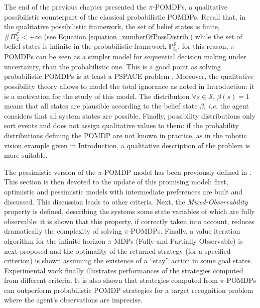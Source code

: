 The end of the previous chapter presented the $\pi$-POMDPs, 
a qualitative possibilistic counterpart of the classical probabilistic POMDPs.
Recall that, in the qualitative possibilistic framework, the set of belief states is finite, 
$\# \Pi^{\mathcal{S}}_{\mathcal{L}} < +\infty$ (see Equation \ref{equation_numberOfPossDistrib})
while the set of belief states is infinite in the probabilistic framework $\mathbb{P}^{\mathcal{S}}_{b_0}$:
for this reason, $\pi$-POMDPs can be seen as a simpler model 
for sequential decision making under uncertainty,
than the probabilistic one. This is a good point as solving probabilistic POMDPs 
is at least a PSPACE problem \cite{Papadimitriou:1987,Madani:1999:UPP:315149.315395}.
Moreover, the qualitative possibility theory allows to model the total ignorance
as noted in Introduction: it is a motivation for the study of this model.
The distribution $\forall s \in \mathcal{S}$, $\beta(s) = 1$ means that all
states are plausible according to the belief state $\beta$, \textit{i.e.} 
the agent considers that all system states are possible. 
Finally, possibility distributions only sort events and does not assign qualitative values to them: 
if the probability distributions defining the POMDP are not known in practice,
as in the robotic vision example given in Introduction,
a qualitative description of the problem is more suitable.

The pessimistic version of the $\pi$-POMDP model 
has been previously defined in \cite{Sabbadin:1999:pipomdp}.
This section is then devoted to the update of this promising model:
first, optimistic and pessimistic models 
with intermediate preferences are built and discussed.
This discussion leads to other criteria.
Next, the \textit{Mixed-Observability} property \cite{OngShaoHsuWee-IJRR10,AraThoBufCha-ICTAI10} 
is defined, describing the systems some state variables 
of which are fully observable:
it is shown that this property, if correctly taken into account,
reduces dramatically the complexity of solving $\pi$-POMDPs.
Finally, a value iteration algorithm for the infinite horizon 
$\pi$-MDPs (Fully and Partially Observable) 
is next proposed and the optimality of the returned strategy (for a specified criterion) 
is shown assuming the existence of a ``stay'' action in some goal states.
Experimental work finally 
illustrates performances of the strategies 
computed from different criteria. 
It is also shown that strategies computed 
from $\pi$-POMDPs can
outperform probabilistic POMDP strategies 
for a target recognition problem 
where the agent's observations are imprecise. 


